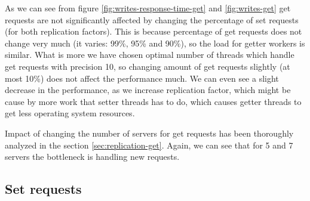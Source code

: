 \documentclass[11pt]{article}
\begin{document}
As we can see from figure \ref{fig:writes-response-time-get} and \ref{fig:writes-get} get requests are not significantly affected by changing the percentage of set requests (for both replication factors). This is because percentage of get requests does not change very much (it varies: 99\%, 95\% and 90\%), so the load for getter workers is similar. What is more we have chosen optimal number of threads which handle get requests with precision 10, so changing amount of get requests slightly (at most 10\%) does not affect the performance much. We can even see a slight decrease in the performance, as we increase replication factor, which might be cause by more work that setter threads has to do, which causes getter threads to get less operating system resources. 

Impact of changing the number of servers for get requests has been thoroughly analyzed in the section \ref{sec:replication-get}. Again, we can see that for 5 and 7 servers the bottleneck is handling new requests.

\subsection{Set requests}
\end{document}

